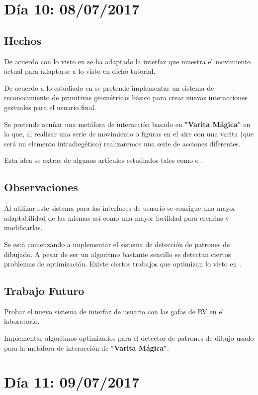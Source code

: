 \documentclass[12pt,a4paper]{article}
\begin{document}
\section{Día 10: 08/07/2017}

\subsection{Hechos}

De acuerdo con lo visto en \cite{Unity Tutorials} se ha adaptado la interfaz que muestra el movimiento actual para adaptarse a lo visto en dicho tutorial.

De acuerdo a lo estudiado en \cite{Vanhatalo} se pretende implementar un sistema de reconocimiento de primitivas geométricas básico para crear nuevas interacciones gestuales para el usuario final.

Se pretende acuñar una metáfora de interacción basado en \textbf{"Varita Mágica"} en la que, al realizar una serie de movimiento o figuras en el aire con una varita (que será un elemento intradiegético) realizaremos una serie de acciones diferentes.

Esta idea se extrae de algunos artículos estudiados tales como \cite{Rausch et al.} o \cite{Clifford et al.}.

\subsection{Observaciones}

Al utilizar este sistema para las interfaces de usuario se consigue una mayor adaptabilidad de las mismas así como una mayor facilidad para crearlas y modificarlas.

Se está comenzando a implementar el sistema de detección de patrones de dibujado. A pesar de ser un algoritmo bastante sencillo se detectan ciertos problemas de optimización.
Existe ciertos trabajos que optimizan lo visto en \cite{Vanhatalo}.

\subsection{Trabajo Futuro}

Probar el nuevo sistema de interfaz de usuario con las gafas de RV en el laboratorio.

Implementar algoritmos optimizados para el detector de patrones de dibujo usado para la metáfora de interacción de \textbf{"Varita Mágica"}.

\section{Día 11: 09/07/2017}
\end{document}
